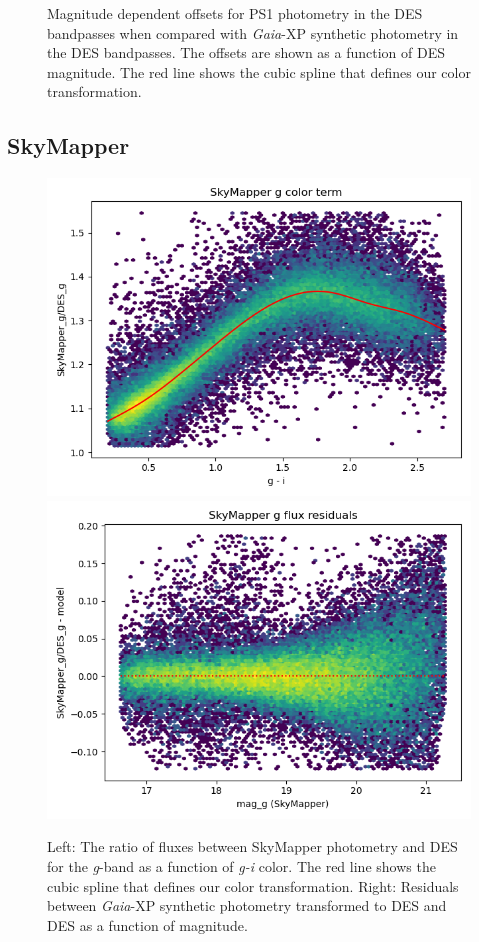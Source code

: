 \begin{figure}
    \caption{Magnitude dependent offsets for PS1 photometry in the DES bandpasses when compared with \emph{Gaia}-XP synthetic photometry in the DES bandpasses. The offsets are shown as a function of DES magnitude. The red line shows the cubic spline that defines our color transformation.}
    \label{fig:mag_spline_ps1}
\end{figure}
\clearpage
\subsection{SkyMapper}
\begin{figure}
    \includegraphics[width=0.49\linewidth]{./figures/color_terms/SkyMapper_to_DES_band_g_color_term.png}
    \includegraphics[width=0.49\linewidth]{./figures/color_terms/SkyMapper_to_DES_band_g_flux_residuals.png}
    \caption{Left: The ratio of fluxes between SkyMapper photometry and DES for the \textit{g}-band as a function of \textit{g-i} color. The red line shows the cubic spline that defines our color transformation.
    Right: Residuals between \emph{Gaia}-XP synthetic photometry transformed to DES and DES as a function of magnitude.}
    \label{fig:acolor-sm-g}
\end{figure}

